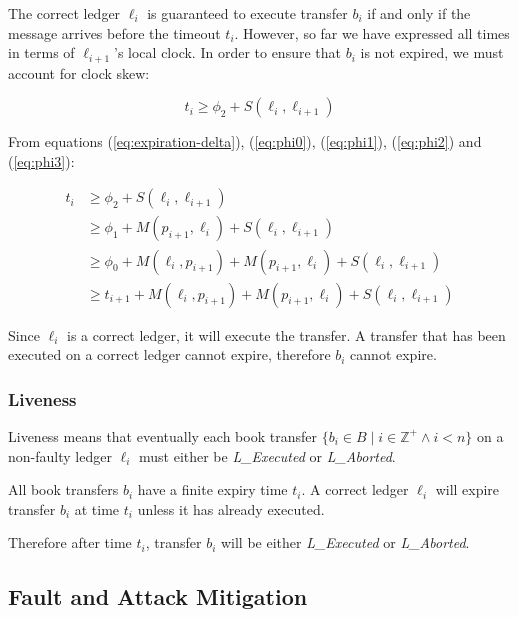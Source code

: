 \documentclass[letterpaper,twocolumn,10pt]{article}
\begin{document}
The correct ledger $\ell_i$ is guaranteed to execute transfer $b_i$ if and only if the message arrives before the timeout $t_i$. However, so far we have expressed all times in terms of $\ell_{i+1}$'s local clock. In order to ensure that $b_i$ is not expired, we must account for clock skew:

\begin{equation}
\label{eq:phi3}
t_i \geq \phi_2 + S(\ell_i, \ell_{i+1})
\end{equation}

From equations (\ref{eq:expiration-delta}), (\ref{eq:phi0}), (\ref{eq:phi1}), (\ref{eq:phi2}) and (\ref{eq:phi3}):

\begin{equation}
\begin{split}
t_i & \geq \phi_2 + S(\ell_i, \ell_{i+1}) \\
    & \geq \phi_1 + M(p_{i+1}, \ell_i) + S(\ell_i, \ell_{i+1}) \\
    & \geq \phi_0 + M(\ell_i, p_{i+1}) + M(p_{i+1}, \ell_i) + S(\ell_i, \ell_{i+1}) \\
    & \geq t_{i+1} + M(\ell_i, p_{i+1}) + M(p_{i+1}, \ell_i) + S(\ell_i, \ell_{i+1})
\end{split}
\end{equation}

Since $\ell_i$ is a correct ledger, it will execute the transfer. A transfer that has been executed on a correct ledger cannot expire, therefore $b_i$ cannot expire.


\subsubsection{Liveness}

Liveness means that eventually each book transfer $ \{ b_i \in B \mid i \in \mathbb{Z}^+ \land i < n \} $ on a non-faulty ledger $\ell_i$ must either be \textit{L\_Executed} or \textit{L\_Aborted}.

All book transfers $b_i$ have a finite expiry time $t_i$. A correct ledger $\ell_i$ will expire transfer $b_i$ at time $t_i$ unless it has already executed.

Therefore after time $t_i$, transfer $b_i$ will be either \textit{L\_Executed} or \textit{L\_Aborted}.


\subsection{Fault and Attack Mitigation}
\end{document}
